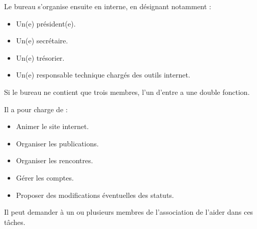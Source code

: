 \documentclass[11pt]{article}
\begin{document}
Le bureau s'organise ensuite en interne, en désignant notamment :
\begin{itemize}
	\item Un(e) président(e).
	\item Un(e) secrétaire.
	\item Un(e) trésorier.
	\item Un(e) responsable technique chargés des outils internet.
\end{itemize}
Si le bureau ne contient que trois membres, l'un d'entre a une double fonction. 

Il a pour charge de :
\begin{itemize}
	\item Animer le site internet.
	\item Organiser les publications.
	\item Organiser les rencontres.
	\item Gérer les comptes.
	\item Proposer des modifications éventuelles des statuts.
\end{itemize}

Il peut demander à un ou plusieurs membres de l'association de l'aider dans ces tâches.
\end{document}
